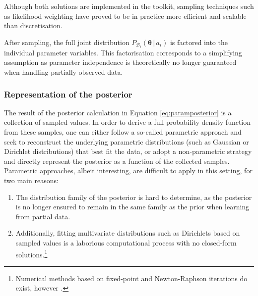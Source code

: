 Although both solutions are implemented in the \opendial{} toolkit, sampling techniques such as likelihood weighting have proved to be in practice more efficient and scalable than discretisation. 

After sampling, the full joint distribution $P_{\mathcal{B}_i}(\boldsymbol\theta \, | \, a_i)$ is factored into the individual parameter variables. This factorisation corresponds to a simplifying assumption as parameter independence is theoretically no longer guaranteed when handling partially observed data. 

\subsubsection*{Representation of the posterior}

The result of the posterior calculation in Equation \eqref{eq:paramposterior} is a collection of sampled values. In order to derive a full probability density function from these samples, one can either follow a so-called parametric approach and seek to reconstruct the underlying parametric distributions (such as Gaussian or Dirichlet distributions) that best fit the data, or adopt a non-parametric strategy and directly represent the posterior as a function of the collected samples. Parametric approaches, albeit interesting, are difficult to apply in this setting, for two main reasons:
\begin{enumerate}
\item The distribution family of the posterior is hard to determine, as the posterior is no longer ensured to remain in the same family as the prior when learning from partial data.  
\item Additionally, fitting multivariate distributions such as Dirichlets based on sampled values is a laborious computational process with no closed-form solutions.\footnote{Numerical methods based on fixed-point and Newton-Raphson iterations do exist, however \citep{minka2003}.}
\end{enumerate}

